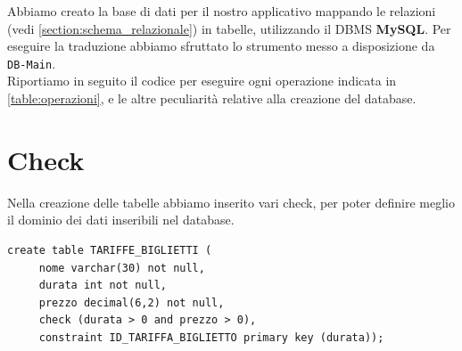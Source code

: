 \documentclass[12pt,a4paper]{report}
\begin{document}
Abbiamo creato la base di dati per il nostro applicativo mappando le relazioni (vedi \autoref{section:schema_relazionale}) in tabelle, utilizzando il DBMS \textbf{MySQL}. Per eseguire la traduzione abbiamo sfruttato lo strumento messo a disposizione da \texttt{DB-Main}. \\
Riportiamo in seguito il codice per eseguire ogni operazione indicata in \autoref{table:operazioni}, e le altre peculiarità relative alla creazione del database.

\section{Check}	
Nella creazione delle tabelle abbiamo inserito vari check, per poter definire meglio il dominio dei dati inseribili nel database. \\

\begin{lstlisting}[style=sqlstyle, caption=Esempio di check utilizzato per definire gli attributi \texttt{prezzo} e \texttt{durata} come numeri positivi.]
create table TARIFFE_BIGLIETTI (
     nome varchar(30) not null,
     durata int not null,
     prezzo decimal(6,2) not null,
     check (durata > 0 and prezzo > 0),
     constraint ID_TARIFFA_BIGLIETTO primary key (durata));
\end{lstlisting}
\end{document}
